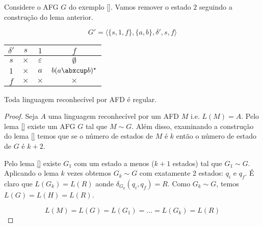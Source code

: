 \begin{example}
Considere o AFG $G$ do exemplo \ref{}.
Vamos remover o estado $2$ seguindo a construção do lema anterior.

\begin{displaymath}
  G' = \langle \{s, 1, f\}, \{a,b\}, \delta', s, f \rangle
\end{displaymath}

  \begin{center}
  \begin{tabular}{c|ccc}
    $\delta'$ & $s$      & $1$           & $f$           \\
    \hline
    $s$       & $\times$ & $\varepsilon$ & $\emptyset$   \\
    $1$       & $\times$ & $a$           & $b(a \abxcup b)^\star$  \\
    $f$       & $\times$ & $\times$      & $\times$       \\
  \end{tabular}
  \end{center}

\begin{center}
\end{center}

\end{example}

\begin{theorem}
Toda linguagem reconhecível por AFD é regular.
\end{theorem}
\begin{proof}
  Seja $A$ uma linguagem reconhecível por um AFD $M$ i.e. $L(M) = A$.
  Pelo lema \ref{} existe um AFG $G$ tal que $M \sim G$.
  Além disso, examinando a construção do lema \ref{} temos que se o número de estados de $M$ é $k$ então o número de estado de $G$ é $k+2$.

  Pelo lema \ref{} existe $G_1$ com um estado a menos ($k + 1$ estados) tal que $G_1 \sim G$.
  Aplicando o lema $k$ vezes obtemos $G_k \sim G$ com exatamente $2$ estados: $q_i$ e $q_f$.
  É claro que $L(G_k) = L(R)$ aonde $\delta_{G_k}(q_i, q_f) = R$.
  Como $G_k \sim G$, temos $L(G) = L(H) = L(R)$.

  \begin{displaymath}
    L(M) = L(G) = L(G_1) = \dots = L(G_k) = L(R)
  \end{displaymath}
\end{proof}


